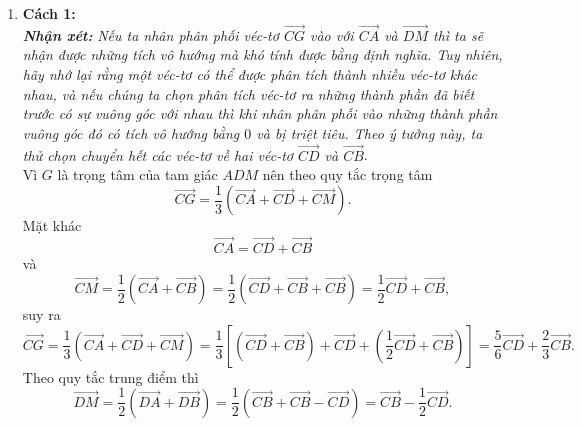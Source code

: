 \begin{vd}
{\begin{enumerate}
			      \textbf{Cách 2:} Đặt hệ trục tọa độ $ Oxy $ vào hình vuông $ ABCD $ sao cho $ O\equiv D $, $ DC $ nằm trên tia $ Ox $ và $ DA $ nằm trên tia $ Oy $. Khi đó ta có $ D(0;0) $, $ A(0;a) $, $ B(a;a) $, $ C(a;0) $. Dễ dàng tính được $ \overrightarrow{AB}=(a;0) $; $ \overrightarrow{AD}=(0;-a) $; $ \overrightarrow{BD}=(-a;-a) $; $ \overrightarrow{BC}=(0;-a) $. Suy ra $ \overrightarrow{AB}+\overrightarrow{AD}=(a;-a) $ và $ \overrightarrow{BD}+\overrightarrow{BC}=(-a;-2a) $.\\
			      Vậy $ \left (\overrightarrow{AB}+\overrightarrow{AD}\right )\left (\overrightarrow{BD}+\overrightarrow{BC}\right )=a\cdot (-a)+(-a)\cdot(-2a)=a^2 $.
			\item \textbf{Cách 1:}\\
			      \textit{\textbf{Nhận xét:}} \textit{Nếu ta nhân phân phối véc-tơ $ \overrightarrow{CG} $ vào với $ \overrightarrow{CA} $ và $ \overrightarrow{DM} $ thì ta sẽ nhận được những tích vô hướng mà khó tính được bằng định nghĩa. Tuy nhiên, hãy nhớ lại rằng một véc-tơ có thể được phân tích thành nhiều véc-tơ khác nhau, và nếu chúng ta chọn phân tích véc-tơ ra những thành phần đã biết trước có sự vuông góc với nhau thì khi nhân phân phối vào những thành phần vuông góc đó có tích vô hướng bằng $ 0 $ và bị triệt tiêu. Theo ý tưởng này, ta thử chọn chuyển hết các véc-tơ về hai véc-tơ $ \overrightarrow{CD} $ và $ \overrightarrow{CB} $}.\\
			      Vì $ G $ là trọng tâm của tam giác $ ADM $ nên theo quy tắc trọng tâm $$ \overrightarrow{CG}=\dfrac{1}{3}\left (\overrightarrow{CA}+\overrightarrow{CD}+\overrightarrow{CM}\right ).$$
			      Mặt khác $$ \overrightarrow{CA}=\overrightarrow{CD}+\overrightarrow{CB} $$ và $$ \overrightarrow{CM}=\dfrac{1}{2}\left( \overrightarrow{CA}+\overrightarrow{CB} \right)=\dfrac{1}{2}\left( \overrightarrow{CD}+\overrightarrow{CB}+\overrightarrow{CB} \right)=\dfrac{1}{2}\overrightarrow{CD}+\overrightarrow{CB} ,$$
			      suy ra $$ \overrightarrow{CG}=\dfrac{1}{3}\left (\overrightarrow{CA}+\overrightarrow{CD}+\overrightarrow{CM}\right )=\dfrac{1}{3}\left [\left( \overrightarrow{CD}+\overrightarrow{CB}\right) +\overrightarrow{CD}+\left( \dfrac{1}{2}\overrightarrow{CD}+\overrightarrow{CB}\right)\right ] =\dfrac{5}{6}\overrightarrow{CD}+\dfrac{2}{3}\overrightarrow{CB} .$$
			      Theo quy tắc trung điểm thì $$ \overrightarrow{DM}=\dfrac{1}{2}\left( \overrightarrow{DA}+\overrightarrow{DB} \right)=\dfrac{1}{2}\left( \overrightarrow{CB}+\overrightarrow{CB}-\overrightarrow{CD} \right)=\overrightarrow{CB}-\dfrac{1}{2}\overrightarrow{CD} .$$

\end{enumerate}}
\end{vd}
